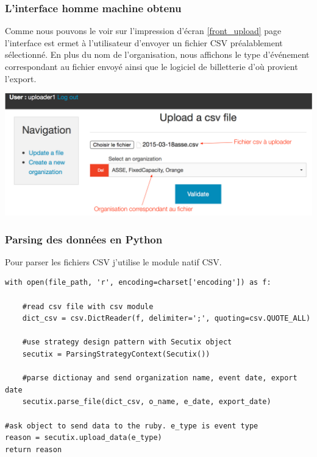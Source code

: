 \subsubsection{L'interface homme machine obtenu}

Comme nous pouvons le voir sur l'impression d'écran \ref{front_upload} page \pageref{front_upload} l'interface est ermet à l'utilisateur d'envoyer un fichier CSV préalablement sélectionné.
En plus du nom de l'organisation, nous affichons le type d'événement correspondant au fichier envoyé ainsi que le logiciel de billetterie d'où provient l'export. \\

\begin{center}
\includegraphics[scale=0.6]{images/front1.png}
\label{front_upload}
\end{center}

\subsubsection{Parsing des données en Python}
Pour parser les fichiers CSV j'utilise le module natif CSV.
\\


\lstset{style=custompython}
\begin{lstlisting}
with open(file_path, 'r', encoding=charset['encoding']) as f:

	#read csv file with csv module
	dict_csv = csv.DictReader(f, delimiter=';', quoting=csv.QUOTE_ALL)
	
	#use strategy design pattern with Secutix object
	secutix = ParsingStrategyContext(Secutix())	
	
	#parse dictionay and send organization name, event date, export date
	secutix.parse_file(dict_csv, o_name, e_date, export_date)

#ask object to send data to the ruby. e_type is event type 
reason = secutix.upload_data(e_type)
return reason
\end{lstlisting}

